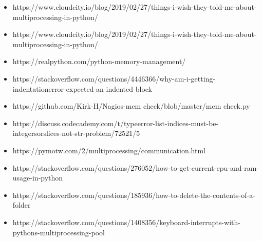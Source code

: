 \documentclass[onecolumn]{article}
\begin{document}
\begin{itemize}
\item https://www.cloudcity.io/blog/2019/02/27/things-i-wish-they-told-me-about-multiprocessing-in-python/
\item https://www.cloudcity.io/blog/2019/02/27/things-i-wish-they-told-me-about-multiprocessing-in-python/
\item https://realpython.com/python-memory-management/
\item https://stackoverflow.com/questions/4446366/why-am-i-getting-indentationerror-expected-an-indented-block
\item https://github.com/Kirk-H/Nagios-mem check/blob/master/mem check.py
\item https://discuss.codecademy.com/t/typeerror-list-indices-must-be-integersorslices-not-str-problem/72521/5
\item https://pymotw.com/2/multiprocessing/communication.html
\item https://stackoverflow.com/questions/276052/how-to-get-current-cpu-and-ram-usage-in-python
\item https://stackoverflow.com/questions/185936/how-to-delete-the-contents-of-a-folder
\item https://stackoverflow.com/questions/1408356/keyboard-interrupts-with-pythons-multiprocessing-pool
\end{itemize}






\nocite{*}


\end{document}
